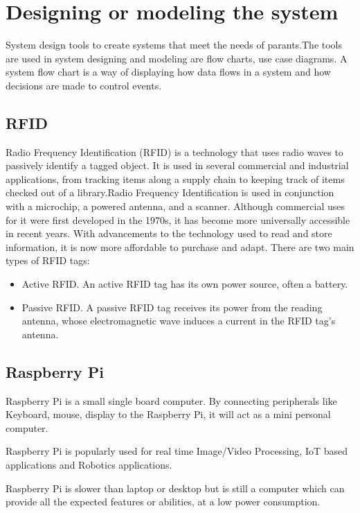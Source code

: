 \section{Designing or modeling the system}
System design tools to create systems that meet the needs of parants.The
tools are used in system designing and modeling are flow charts, use case diagrams. A system flow chart is a way
of displaying how data flows in a system and how decisions are made to control
events.

\subsection{RFID}
\par Radio Frequency Identification (RFID) is a technology that uses radio waves to passively identify a tagged object. It is used in several commercial and industrial applications, from tracking items along a supply chain to keeping track of items checked out of a library.Radio Frequency Identification is used in conjunction with a microchip, a powered antenna, and a scanner. Although commercial uses for it were first developed in the 1970s, it has become more universally accessible in recent years. With advancements to the technology used to read and store information, it is now more affordable to purchase and adapt.
There are two main types of RFID tags:
\begin{itemize}
	\item Active RFID. An active RFID tag has its own power source, often a battery.
	\item Passive RFID. A passive RFID tag receives its power from the reading antenna, whose electromagnetic wave induces a current in the RFID tag's antenna.
\end{itemize}

\subsection{Raspberry Pi}
\par Raspberry Pi is a small single board computer. By connecting peripherals like Keyboard, mouse, display to the Raspberry Pi, it will act as a mini personal computer.

Raspberry Pi is popularly used for real time Image/Video Processing, IoT based applications and Robotics applications.

Raspberry Pi is slower than laptop or desktop but is still a computer which can provide all the expected features or abilities, at a low power consumption.

